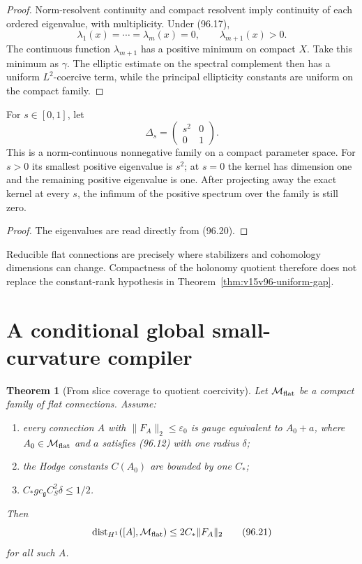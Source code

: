 \documentclass[11pt]{article}
\newtheorem{theorem}{Theorem}[section]
\theoremstyle{remark}
\begin{document}
\begin{proof}
Norm-resolvent continuity and compact resolvent imply continuity of
each ordered eigenvalue, with multiplicity.  Under (96.17),
\[
 \lambda_1(x)=\cdots=\lambda_m(x)=0,\qquad
 \lambda_{m+1}(x)>0.                                  \tag{96.19}
\]
The continuous function \(\lambda_{m+1}\) has a positive minimum
on compact \(X\).  Take this minimum as \(\gamma\).  The elliptic
estimate on the spectral complement then has a uniform
\(L^2\)-coercive term, while the principal ellipticity constants
are uniform on the compact family.
\end{proof}

\begin{counterexample}
\label{cnt:v15v96-kernel-jump}
For \(s\in[0,1]\), let
\[
 \Delta_s=
 \begin{pmatrix}s^2&0\\0&1\end{pmatrix}.              \tag{96.20}
\]
This is a norm-continuous nonnegative family on a compact parameter
space.  For \(s>0\) its smallest positive eigenvalue is \(s^2\);
at \(s=0\) the kernel has dimension one and the remaining positive
eigenvalue is one.  After projecting away the exact kernel at every
\(s\), the infimum of the positive spectrum over the family is
still zero.
\end{counterexample}

\begin{proof}
The eigenvalues are read directly from (96.20).
\end{proof}

Reducible flat connections are precisely where stabilizers and
cohomology dimensions can change.  Compactness of the holonomy
quotient therefore does not replace the constant-rank hypothesis
in Theorem~\ref{thm:v15v96-uniform-gap}.

\section{A conditional global small-curvature compiler}

\begin{theorem}[From slice coverage to quotient coercivity]
\label{thm:v15v96-global-conditional}
Let \({\cal M}_{\rm flat}\) be a compact family of flat connections.
Assume:
\begin{enumerate}
\item every connection \(A\) with
      \(\|F_A\|_2\leq\varepsilon_0\) is gauge equivalent to
      \(A_0+a\), where \(A_0\in{\cal M}_{\rm flat}\) and \(a\)
      satisfies (96.12) with one radius \(\delta\);
\item the Hodge constants \(C(A_0)\) are bounded by one \(C_*\);
\item \(C_*g c_{\mathfrak g}C_S^2\delta\leq1/2\).
\end{enumerate}
Then
\[
 \operatorname{dist}_{H^1}([A],{\cal M}_{\rm flat})
 \leq2C_*\|F_A\|_2                                    \tag{96.21}
\]
for all such \(A\).
\end{theorem}
\end{document}
